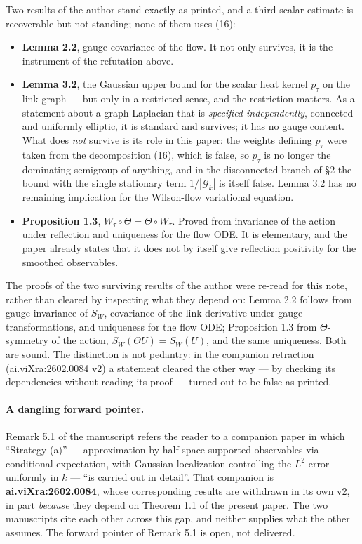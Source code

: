\documentclass[11pt]{article}
\begin{document}
Two results of the author stand exactly as printed, and a third scalar estimate is
recoverable but not standing; none of them uses (16):
\begin{itemize}
\item \textbf{Lemma 2.2}, gauge covariance of the flow. It not only survives, it is the
instrument of the refutation above.
\item \textbf{Lemma 3.2}, the Gaussian upper bound for the scalar heat kernel $p_\tau$
on the link graph --- but only in a restricted sense, and the restriction matters. As
a statement about a graph Laplacian that is \emph{specified independently}, connected
and uniformly elliptic, it is standard and survives; it has no gauge content. What
does \emph{not} survive is its role in this paper: the weights defining $p_\tau$ were
taken from the decomposition (16), which is false, so $p_\tau$ is no longer the
dominating semigroup of anything, and in the disconnected branch of \S2 the bound with
the single stationary term $1/|\mathcal G_k|$ is itself false. Lemma 3.2 has no
remaining implication for the Wilson-flow variational equation.
\item \textbf{Proposition 1.3}, $W_\tau\circ\Theta=\Theta\circ W_\tau$. Proved from
invariance of the action under reflection and uniqueness for the flow ODE. It is
elementary, and the paper already states that it does not by itself give reflection
positivity for the smoothed observables.
\end{itemize}

\noindent
The proofs of the two surviving results of the author were re-read for this note,
rather than cleared by inspecting what they depend on: Lemma 2.2 follows from gauge
invariance of $S_W$, covariance of the link derivative under gauge transformations,
and uniqueness for the flow ODE; Proposition 1.3 from $\Theta$-symmetry of the action,
$S_W(\Theta U)=S_W(U)$, and the same uniqueness. Both are sound. The distinction is
not pedantry: in the companion retraction (ai.viXra:2602.0084 v2) a statement cleared
the other way --- by checking its dependencies without reading its proof --- turned
out to be false as printed.

\paragraph{A dangling forward pointer.} Remark 5.1 of the manuscript refers the reader
to a companion paper in which ``Strategy (a)'' --- approximation by
half-space-supported observables via conditional expectation, with Gaussian
localization controlling the $L^2$ error uniformly in $k$ --- ``is carried out in
detail''. That companion is \textbf{ai.viXra:2602.0084}, whose corresponding results
are withdrawn in its own v2, in part \emph{because} they depend on Theorem 1.1 of the
present paper. The two manuscripts cite each other across this gap, and neither
supplies what the other assumes. The forward pointer of Remark 5.1 is open, not
delivered.
\end{document}
